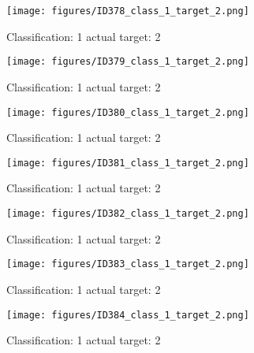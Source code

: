 \begin{figure}[h!]
\begin{center}
\texttt{[image: figures/ID378\_class\_1\_target\_2.png]}
\end{center}
\caption{ Classification: 1 actual target: 2}
\label{fig:ID378_class_1_target_2}
\end{figure}
\begin{figure}[h!]
\begin{center}
\texttt{[image: figures/ID379\_class\_1\_target\_2.png]}
\end{center}
\caption{ Classification: 1 actual target: 2}
\label{fig:ID379_class_1_target_2}
\end{figure}
\begin{figure}[h!]
\begin{center}
\texttt{[image: figures/ID380\_class\_1\_target\_2.png]}
\end{center}
\caption{ Classification: 1 actual target: 2}
\label{fig:ID380_class_1_target_2}
\end{figure}
\begin{figure}[h!]
\begin{center}
\texttt{[image: figures/ID381\_class\_1\_target\_2.png]}
\end{center}
\caption{ Classification: 1 actual target: 2}
\label{fig:ID381_class_1_target_2}
\end{figure}
\begin{figure}[h!]
\begin{center}
\texttt{[image: figures/ID382\_class\_1\_target\_2.png]}
\end{center}
\caption{ Classification: 1 actual target: 2}
\label{fig:ID382_class_1_target_2}
\end{figure}
\begin{figure}[h!]
\begin{center}
\texttt{[image: figures/ID383\_class\_1\_target\_2.png]}
\end{center}
\caption{ Classification: 1 actual target: 2}
\label{fig:ID383_class_1_target_2}
\end{figure}
\begin{figure}[h!]
\begin{center}
\texttt{[image: figures/ID384\_class\_1\_target\_2.png]}
\end{center}
\caption{ Classification: 1 actual target: 2}
\label{fig:ID384_class_1_target_2}
\end{figure}
